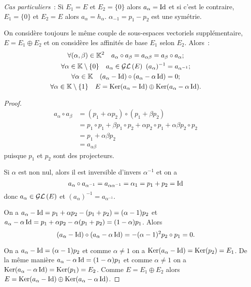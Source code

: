 \emph{Cas particuliers}~: Si \(E_1=E\) et \(E_2=\{0\}\) alors \(a_\alpha=\operatorname{Id}\) et si c'est le contraire, \(E_1=\{0\}\) et \(E_2=E\) alors \(a_\alpha=h_\alpha\). \(\alpha_{-1}=p_1-p_2\) est une symétrie.

\begin{prop}
  On considère toujours le même couple de sous-espaces vectoriels supplémentaire, \(E=E_1 \oplus E_2\) et on considère les affinités de base \(E_1\) selon \(E_2\). Alors~:
  \begin{gather}
    \forall (\alpha,\beta) \in \K^2 \quad a_{\alpha} \circ a_{\beta} = a_{\alpha \beta} = a_{\beta} \circ a_{\alpha} ;\\
    \forall \alpha \in \K\setminus\{0\} \quad a_\alpha \in \GL{E} \ (a_\alpha)^{-1}=a_{\alpha^{-1}} ; \\
    \forall \alpha \in \K \quad (a_\alpha-\Id) \circ (a_\alpha -\alpha \Id)=0 ; \\
    \forall \alpha \in \K\setminus\{1\} \quad E=\Ker(a_\alpha - \Id) \oplus \Ker(a_\alpha - \alpha \Id).
  \end{gather}
\end{prop}
\begin{proof}
  \begin{align}
    a_{\alpha} \circ a_{\beta} &= (p_1+\alpha p_2) \circ (p_1+\beta p_2) \\
                               &= p_1 \circ p_1 + \beta p_1 \circ p_2 + \alpha p_2 \circ p_1 +\alpha \beta p_2 \circ p_2 \\
                               &=p_1+ \alpha\beta p_2\\
                               &=a_{\alpha\beta}
  \end{align}
  puisque \(p_1\) et \(p_2\) sont des projecteurs.

  Si \(\alpha\) est non nul, alors il est inversible d'invers \(\alpha^{-1}\) et on a
  \begin{equation}
    a_\alpha \circ a_{\alpha^{-1}} = a_{\alpha \alpha^{-1}} = \alpha_1 = p_1+p_2=\operatorname{Id}
  \end{equation}
  donc \(a_\alpha \in \mathcal{GL}\left(E\right)\) et \((a_\alpha)^{-1}=a_{\alpha^{-1}}\).

  On a \(a_\alpha - \operatorname{Id}=p_1+\alpha p_2 -(p_1+p_2) = (\alpha-1)p_2\) et \(a_\alpha -\alpha \operatorname{Id} = p_1+\alpha p_2 -\alpha(p_1+p_2) = (1-\alpha)p_1\). Alors
  \begin{equation}
    (a_\alpha-\operatorname{Id}) \circ (a_\alpha -\alpha \operatorname{Id}) = -(\alpha-1)^2 p_2 \circ p_1=0.
  \end{equation}

  On a \(a_\alpha-\operatorname{Id} = (\alpha-1)p_2\) et comme \(\alpha \neq 1\) on a \(\operatorname{Ker}(a_\alpha-\operatorname{Id})=\operatorname{Ker}(p_2)=E_1\). De la même manière \(a_{\alpha}-\alpha \operatorname{Id} = (1-\alpha)p_1\) et comme \(\alpha \neq 1\) on a \(\operatorname{Ker}(a_\alpha-\alpha\operatorname{Id})=\operatorname{Ker}(p_1)=E_2\). Comme \(E=E_1 \oplus E_2\) alors \(E=\operatorname{Ker}(a_\alpha - \operatorname{Id}) \oplus \operatorname{Ker}(a_\alpha - \alpha \operatorname{Id})\).
\end{proof}

